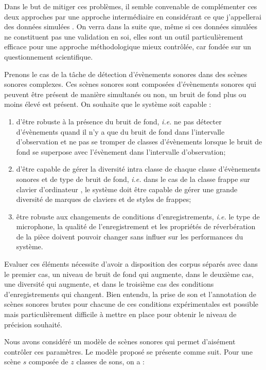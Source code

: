 Dans le but de mitiger ces problèmes, il semble convenable de complémenter ces deux approches par une approche intermédiaire en considérant ce que j'appellerai des données \og simulées \fg. On verra dans la suite que, même si ces données simulées ne constituent pas une validation en soi, elles sont un outil particulièrement efficace pour une approche méthodologique mieux contrôlée, car fondée sur un questionnement scientifique.

Prenons le cas de la tâche de détection d'évènements sonores dans des scènes sonores complexes. Ces scènes sonores sont composées d'évènements sonores qui peuvent être présent de manière simultanés ou non, un bruit de fond plus ou moins élevé est présent. On souhaite que le système soit capable :
\begin{enumerate}
  \item d'être robuste à la présence du bruit de fond, \textit{i.e.} ne pas détecter d'évènements quand il n'y a que du bruit de fond dans l'intervalle d'observation et ne pas se tromper de classes d'évènements lorsque le bruit de fond se superpose avec l'évènement  dans l'intervalle d'observation;
  \item d'être capable de gérer la diversité intra classe de chaque classe d'évènements sonores et de type de bruit de fond,  \textit{i.e.} dans le cas de la classe \og frappe sur clavier d'ordinateur \fg, le système doit être capable de gérer une grande diversité de marques de claviers et de styles de frappes;
  \item être robuste aux changements de conditions d'enregistrements,  \textit{i.e.} le type de microphone, la qualité de l'enregistrement et les propriétés de réverbération de la pièce doivent pouvoir changer sans influer sur les performances du système.
\end{enumerate}

Evaluer ces éléments nécessite d'avoir a disposition des corpus séparés avec dans le premier cas, un niveau de bruit de fond qui augmente, dans le deuxième cas, une diversité qui augmente, et dans le troisième cas des conditions d'enregistrements qui changent. Bien entendu, la prise de son et l'annotation de scènes sonores brutes pour chacune de ces conditions expérimentales est possible mais particulièrement difficile à mettre en place pour obtenir le niveau de précision souhaité.

Nous avons considéré un modèle de scènes sonores qui permet d'aisément contrôler ces paramètres. Le modèle proposé se présente comme suit. Pour une scène $s$ composée de $z$ classes de sons, on a :

